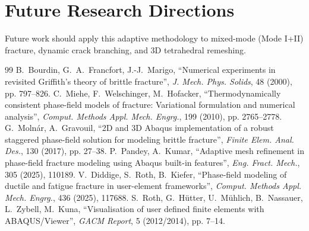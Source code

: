 \documentclass[11pt,a4paper]{report}
\begin{document}
\section{Future Research Directions}
Future work should apply this adaptive methodology to mixed-mode (Mode I+II) fracture, dynamic crack branching, and 3D tetrahedral remeshing.

\begin{thebibliography}{99}
 B.~Bourdin, G.~A.~Francfort, J.-J.~Marigo, ``Numerical experiments in revisited Griffith's theory of brittle fracture'', \textit{J. Mech. Phys. Solids}, 48 (2000), pp. 797--826.
 C.~Miehe, F.~Welschinger, M.~Hofacker, ``Thermodynamically consistent phase-field models of fracture: Variational formulation and numerical analysis'', \textit{Comput. Methods Appl. Mech. Engrg.}, 199 (2010), pp. 2765--2778.
 G.~Moln\'ar, A.~Gravouil, ``2D and 3D Abaqus implementation of a robust staggered phase-field solution for modeling brittle fracture'', \textit{Finite Elem. Anal. Des.}, 130 (2017), pp. 27--38.
 P.~Pandey, A.~Kumar, ``Adaptive mesh refinement in phase-field fracture modeling using Abaqus built-in features'', \textit{Eng. Fract. Mech.}, 305 (2025), 110189.
 V.~Diddige, S.~Roth, B.~Kiefer, ``Phase-field modeling of ductile and fatigue fracture in user-element frameworks'', \textit{Comput. Methods Appl. Mech. Engrg.}, 436 (2025), 117688.
 S.~Roth, G.~H\"utter, U.~M\"uhlich, B.~Nassauer, L.~Zybell, M.~Kuna, ``Visualisation of user defined finite elements with ABAQUS/Viewer'', \textit{GACM Report}, 5 (2012/2014), pp. 7--14.
\end{thebibliography}
\end{document}

